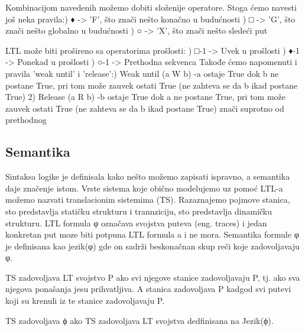 \documentclass[a4paper]{article}
\begin{document}
{	Kombinacijom navedenih možemo dobiti složenije operatore. Stoga ćemo navesti još neka pravila:\newline {}) ♦ -> 'F', što znači nešto konačno u budućnosti ) □ -> 'G', što znači nešto globalno u budućnosti ) ○ -> 'X', što znači nešto sledeći put \newline

	LTL može biti prošireno sa operatorima prošlosti: \newline {}) □-1 -> Uvek u prošlosti ) ♦-1 -> Ponekad u prošlosti ) ○-1 -> Prethodna sekvenca \newline\newline
		Takođe ćemo napomenuti i pravila 'weak until' i 'release':) Weak until (a W b) \newline
		-a ostaje True dok b ne postane True, pri tom može zauvek ostati True (ne zahteva se da b ikad postane True)
	2) Release (a R b) \newline
		-b ostaje True dok a ne postane True, pri tom može zauvek ostati True (ne zahteva se da b ikad postane True) znači suprotno od prethodnog \newline

	\subsection{Semantika}
	\label{subsec:podnaslovN}
	\newline
	Sintaksa logike je definisala kako nešto možemo zapisati ispravno, a semantika daje značenje istom.
	Vrste sistema koje obično modelujemo uz pomoć LTL-a možemo nazvati translacionim sistemima (TS). Razaznajemo pojmove stanica, sto predstavlja statičku strukturu i trannziciju, sto predstavlja dinamičku strukturu.
	LTL formula φ označava svojstva puteva (eng. traces) i jedan konkretan put moze biti potpuna LTL formula a i ne mora.
	Semantika formule φ je definisana kao jezik(φ) gde on sadrži beskonačnan skup reči koje zadovoljavaju φ.

	TS zadovoljava LT svojstvo P ako svi njegove stanice zadovoljavaju P, tj. ako sva njegova ponašanja jesu prihvatljiva. A stanica zadovoljava P kadgod svi putevi koji su krenuli iz te stanice zadovoljavaju P.

	TS zadovoljava ϕ ako TS zadovoljava LT svojstva dedfinisana na Jezik(ϕ).
	}
\end{document}
